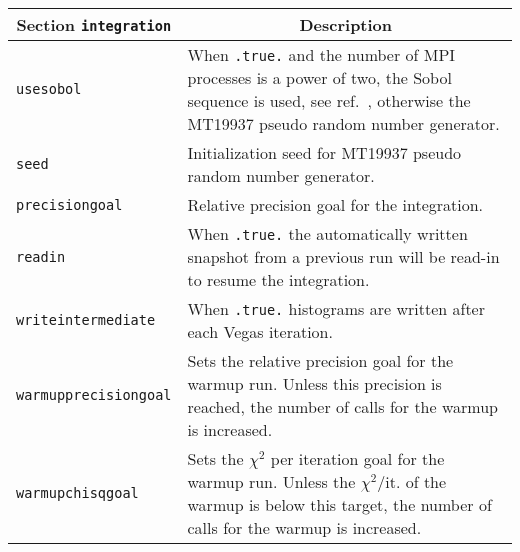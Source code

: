 	\begin{longtable}{p{1.5cm}p{12cm}}
		\hline
		\multicolumn{1}{c}{{\textbf{Section} \texttt{integration}}} & \multicolumn{1}{c}{{\textbf{Description}}} \\ 
		\hline
		\texttt{usesobol} & When \texttt{.true.} and the number of MPI processes is a power of two, the Sobol 
		sequence is used, see ref.~\cite{MCFM9}, otherwise the MT19937 pseudo random number generator. \\
		\texttt{seed} & Initialization seed for MT19937 pseudo random number generator. \\
		\texttt{precisiongoal} & Relative precision goal for the integration. \\
		\texttt{readin} & When \texttt{.true.} the automatically written snapshot from a previous run will be read-in
		to resume the integration. \\
		\texttt{writeintermediate} & When \texttt{.true.} histograms are written after each Vegas iteration. \\
		\texttt{warmupprecisiongoal} & Sets the relative precision goal for the warmup run. Unless this precision
		is reached, the number of calls for the warmup is increased. \\
		\texttt{warmupchisqgoal} & Sets the $\chi^2$ per iteration goal for the warmup run. Unless the 
		$\chi^2/\text{it.}$ of the warmup is below this target, the number of calls for the warmup is increased. \\
		\hline
	\end{longtable}
\clearpage
